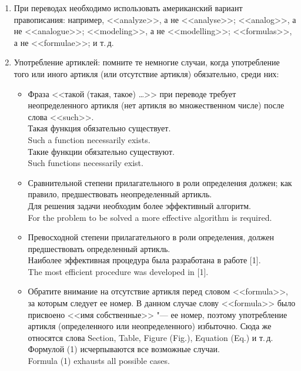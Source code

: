 \documentclass[a5paper, 10pt, twoside, numbers=enddot]{scrartcl}
\begin{document}
\begin{enumerate}
  \item При переводах необходимо использовать американский вариант правописания: например, <<analyze>>, а не <<analyse>>; <<analog>>, а не <<analogue>>; <<modeling>>, а не <<modelling>>; <<formulas>>, а не <<formulae>>; и т.\,д.

  \item Употребление артиклей: помните те немногие случаи, когда употребление того или иного артикля (или отсутствие артикля) обязательно, среди них:
  \begin{itemize}
    \item Фраза <<такой (такая, такое) \ldots>> при переводе требует неопределенного артикля (нет артикля во множественном числе) после слова <<such>>. \\ [4pt] \textsf{
      Такая функция обязательно существует. \\
      Such a function necessarily exists. \\ [4pt]
      Такие функции обязательно существуют. \\
      Such functions necessarily exist.}

   \item Сравнительной степени прилагательного в роли определения должен; как правило, предшествовать неопределенный артикль. \\ [4pt] \textsf{
     Для решения задачи необходим более эффективный алгоритм. \\
     For the problem to be solved a more effective algorithm is required.}

   \item Превосходной степени прилагательного в роли определения, должен предшествовать определенный артикль. \\ [3pt] \textsf{
     Наиболее эффективная процедура была разработана в работе [1]. \\
     The most efficient procedure was developed in [1].}

   \item Обратите внимание на отсутствие артикля перед словом <<formula>>, за которым следует ее номер. В данном случае слову <<formula>> было присвоено <<имя собственные>> "--- ее номер, поэтому употребление артикля (определенного или неопределенного) избыточно. Сюда же относятся слова Section, Table, Figure (Fig.), Equation (Eq.) и т.\,д. \\ [3pt] \textsf{
     Формулой (1) исчерпываются все возможные случаи. \\
     Formula (1) exhausts all possible cases.}


\end{itemize}
\end{enumerate}
\end{document}
